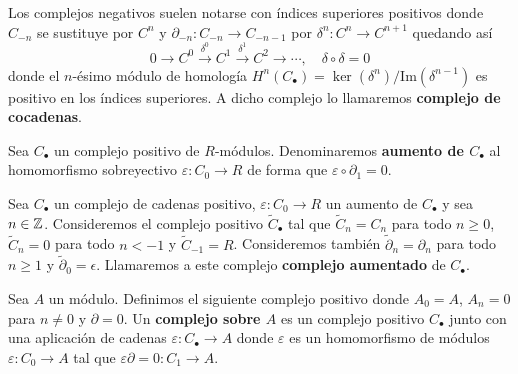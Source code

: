 Los complejos negativos suelen notarse con índices superiores positivos donde $C_{-n}$ se sustituye por $C^n$ y $\partial_{-n} : C_{-n} \rightarrow C_{-n-1}$ por $\delta^n: C^n \rightarrow C^{n+1}$ quedando así
\[ 0 \to C^0 \xrightarrow{\delta^0} C^1 \xrightarrow{\delta^1} C^2 \to \cdots, \quad \delta \circ \delta = 0 \]
donde el $n$-ésimo módulo de homología \( H^n(C_{\bullet}) = \ker(\delta^n)/\text{Im}(\delta^{n-1}) \) es positivo en los índices superiores. A dicho complejo lo llamaremos \textbf{complejo de cocadenas}.

\begin{definicion}
	Sea $C_{\bullet}$ un complejo positivo de $R$-módulos. Denominaremos \textbf{aumento de $C_{\bullet}$} al homomorfismo sobreyectivo $\varepsilon : C_0 \to R$ de forma que $\varepsilon \circ \partial_1 = 0$.
\end{definicion}

\begin{definicion}
	Sea $C_{\bullet}$ un complejo de cadenas positivo, $\varepsilon : C_0 \to R$ un aumento de $C_{\bullet}$ y sea $n \in \mathbb{Z}$. Consideremos el complejo positivo $\widetilde{C}_{\bullet}$ tal que $\widetilde{C}_n = C_n$ para todo $n \geq 0$, $\widetilde{C}_n = 0$ para todo $n < -1$ y $\widetilde{C}_{-1}=R$. Consideremos también $\widetilde{\partial}_n = \partial_n$ para todo $n \geq 1$ y $\widetilde{\partial}_0= \epsilon$. Llamaremos a este complejo \textbf{complejo aumentado} de $C_{\bullet}$.
\end{definicion}
%

\begin{definicion}
	Sea $A$ un módulo. Definimos el siguiente complejo positivo donde \( A_0 = A \), \( A_n = 0 \) para \( n \neq 0 \) y \( \partial = 0 \). Un \textbf{complejo sobre \( A \)} es un complejo positivo \( C_{\bullet} \) junto con una aplicación de cadenas \( \varepsilon: C_{\bullet} \to A \) donde \( \varepsilon \) es un homomorfismo de módulos \( \varepsilon: C_0 \to A \) tal que \( \varepsilon \partial = 0: C_1 \to A \).
\end{definicion}


